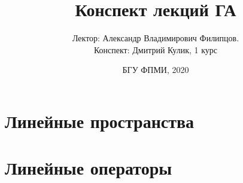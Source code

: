 \documentclass[12pt,a4paper,oneside]{report}
\title{Конспект лекций ГА}
\author{Лектор: Александр Владимирович Филипцов.\\Конспект: Дмитрий Кулик, 1 курс}
\date{БГУ ФПМИ, 2020}
\begin{document}
\maketitle
\tableofcontents
\chapter{Линейные пространства}
\chapter{Линейные операторы}



\end{document}
